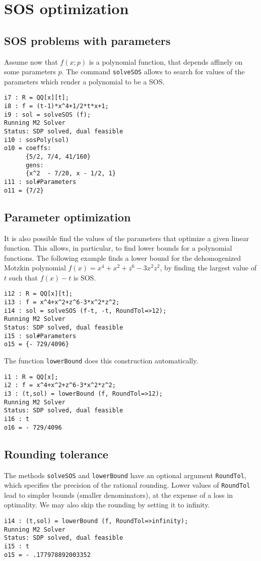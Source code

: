 \documentclass[11pt]{amsart}
\theoremstyle{plain}%
\theoremstyle{definition}
\theoremstyle{remark}
\begin{document}

\section{SOS optimization}

\subsection*{SOS problems with parameters}
Assume now that $f(x;p)$ is a polynomial function, that depends affinely on some parameters $p$.
The command \verb|solveSOS| allows to search for values of the parameters which render a polynomial to be a SOS.
{\small
\begin{verbatim}
i7 : R = QQ[x][t];
i8 : f = (t-1)*x^4+1/2*t*x+1;
i9 : sol = solveSOS (f);
Running M2 Solver
Status: SDP solved, dual feasible
i10 : sosPoly(sol)
o10 = coeffs:
      {5/2, 7/4, 41/160}
      gens:
      {x^2  - 7/20, x - 1/2, 1}
i11 : sol#Parameters
o11 = {7/2}
\end{verbatim}
}

\subsection*{Parameter optimization}
It is also possible find the values of the parameters that optimize a given linear function.
This allows, in particular, to find lower bounds for a polynomial functions.
The following example finds a lower bound for the dehomogenized Motzkin polynomial $f(x)=x^4{+}x^2{+}z^6{-}3 x^2 z^2$, by finding the largest value of $t$ such that $f(x)-t$ is SOS.
{\small
\begin{verbatim}
i12 : R = QQ[x][t];
i13 : f = x^4+x^2+z^6-3*x^2*z^2;
i14 : sol = solveSOS (f-t, -t, RoundTol=>12);
Running M2 Solver
Status: SDP solved, dual feasible
i15 : sol#Parameters
o15 = {- 729/4096}
\end{verbatim}
}
The function \verb|lowerBound| does this construction automatically.
{\small
\begin{verbatim}
i1 : R = QQ[x];
i2 : f = x^4+x^2+z^6-3*x^2*z^2;
i3 : (t,sol) = lowerBound (f, RoundTol=>12);
Running M2 Solver
Status: SDP solved, dual feasible
i16 : t
o16 = - 729/4096
\end{verbatim}
}

\subsection*{Rounding tolerance}
The methods \verb|solveSOS| and \verb|lowerBound| have an optional argument \verb|RoundTol|, which specifies the precision of the rational rounding.
Lower values of \verb|RoundTol| lead to simpler bounds (smaller denominators), at the expense of a loss in optimality.
We may also skip the rounding by setting it to infinity.
{\small
\begin{verbatim}
i14 : (t,sol) = lowerBound (f, RoundTol=>infinity);
Running M2 Solver
Status: SDP solved, dual feasible
i15 : t
o15 = - .177978892003352
\end{verbatim}
}
\end{document}
